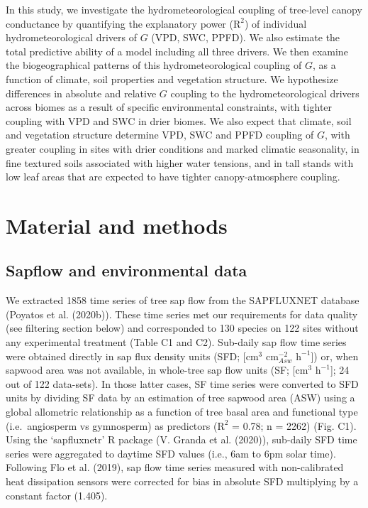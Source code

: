 \documentclass[11pt,twoside]{reedthesis}
\begin{document}
In this study, we investigate the hydrometeorological coupling of
tree-level canopy conductance by quantifying the explanatory power
(\(\text{R}^2\)) of individual hydrometeorological drivers of \(G\)
(VPD, SWC, PPFD). We also estimate the total predictive ability of a
model including all three drivers. We then examine the biogeographical
patterns of this hydrometeorological coupling of \(G\), as a function of
climate, soil properties and vegetation structure. We hypothesize
differences in absolute and relative \(G\) coupling to the
hydrometeorological drivers across biomes as a result of specific
environmental constraints, with tighter coupling with VPD and SWC in
drier biomes. We also expect that climate, soil and vegetation structure
determine VPD, SWC and PPFD coupling of \(G\), with greater coupling in
sites with drier conditions and marked climatic seasonality, in fine
textured soils associated with higher water tensions, and in tall stands
with low leaf areas that are expected to have tighter canopy-atmosphere
coupling.\par

\section{Material and methods}\label{material-and-methods}

\subsection{Sapflow and environmental
data}\label{sapflow-and-environmental-data}

We extracted 1858 time series of tree sap flow from the SAPFLUXNET
database (Poyatos et al. (2020b)). These time series met our
requirements for data quality (see filtering section below) and
corresponded to 130 species on 122 sites without any experimental
treatment (Table C1 and C2). Sub-daily sap flow time series were
obtained directly in sap flux density units (SFD; {[}\(\text{cm}^3\)
\(\text{cm}^{-2}_{Asw}\) \(\text{h}^{-1}\){]}) or, when sapwood area was
not available, in whole-tree sap flow units (SF; {[}\(\text{cm}^3\)
\(\text{h}^{-1}\){]}; 24 out of 122 data-sets). In those latter cases,
SF time series were converted to SFD units by dividing SF data by an
estimation of tree sapwood area (ASW) using a global allometric
relationship as a function of tree basal area and functional type
(i.e.~angiosperm vs gymnosperm) as predictors (\(\text{R}^2\) = 0.78; n
= 2262) (Fig. C1). Using the `sapfluxnetr' R package (V. Granda et al.
(2020)), sub-daily SFD time series were aggregated to daytime SFD values
(i.e., 6am to 6pm solar time). Following Flo et al. (2019), sap flow
time series measured with non-calibrated heat dissipation sensors were
corrected for bias in absolute SFD multiplying by a constant factor
(1.405).\par
\end{document}
